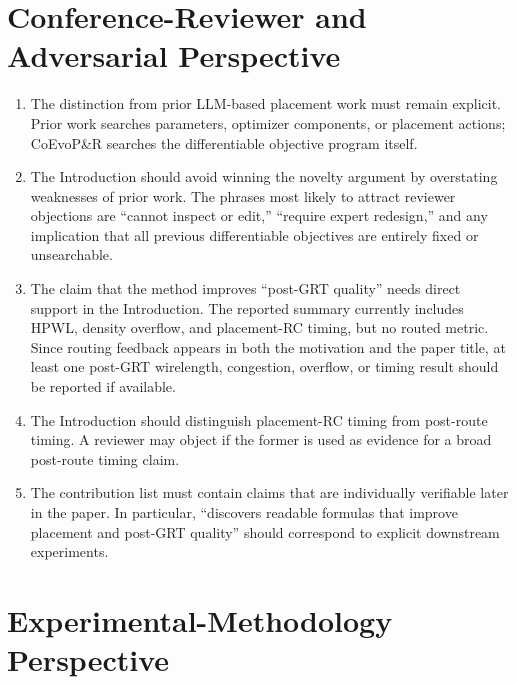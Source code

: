 \documentclass[11pt]{article}
\begin{document}
\section{Conference-Reviewer and Adversarial Perspective}

\begin{enumerate}
  \item The distinction from prior LLM-based placement work must remain
  explicit. Prior work searches parameters, optimizer components, or placement
  actions; CoEvoP\&R searches the differentiable objective program itself.

  \item The Introduction should avoid winning the novelty argument by
  overstating weaknesses of prior work. The phrases most likely to attract
  reviewer objections are ``cannot inspect or edit,'' ``require expert
  redesign,'' and any implication that all previous differentiable objectives
  are entirely fixed or unsearchable.

  \item The claim that the method improves ``post-GRT quality'' needs direct
  support in the Introduction. The reported summary currently includes HPWL,
  density overflow, and placement-RC timing, but no routed metric. Since
  routing feedback appears in both the motivation and the paper title, at least
  one post-GRT wirelength, congestion, overflow, or timing result should be
  reported if available.

  \item The Introduction should distinguish placement-RC timing from
  post-route timing. A reviewer may object if the former is used as evidence
  for a broad post-route timing claim.

  \item The contribution list must contain claims that are individually
  verifiable later in the paper. In particular, ``discovers readable formulas
  that improve placement and post-GRT quality'' should correspond to explicit
  downstream experiments.
\end{enumerate}

\section{Experimental-Methodology Perspective}
\end{document}
